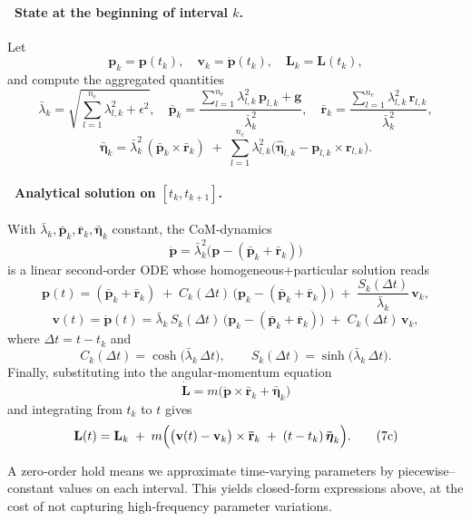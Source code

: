 \documentclass[main.tex]{subfiles}
\begin{document}
\paragraph{\ State at the beginning of interval $k$.}
Let
\[
\mathbf{p}_k = \mathbf{p}(t_k),\quad
\mathbf{v}_k = \dot{\mathbf{p}}(t_k),\quad
\mathbf{L}_k = \mathbf{L}(t_k),
\]
and compute the aggregated quantities
\[
\bar\lambda_k
=\sqrt{\sum_{l=1}^{n_e}\lambda_{l,k}^2+\epsilon^2},\quad
\mathbf{\bar{p}}_k
=\frac{\sum_{l=1}^{n_e}\lambda_{l,k}^2\,\mathbf{p}_{l,k}+\mathbf{g}}{\bar\lambda_k^2},\quad
\mathbf{\bar{r}}_k
=\frac{\sum_{l=1}^{n_e}\lambda_{l,k}^2\,\mathbf{r}_{l,k}}{\bar\lambda_k^2},
\]
\[
\mathbf{\bar{\boldsymbol{\eta}}}_k
=\bar\lambda_k^2\,(\mathbf{\bar{p}}_k\times\mathbf{\bar{r}}_k)
\;+\;\sum_{l=1}^{n_e}\lambda_{l,k}^2\bigl(\mathbf{\hat{\boldsymbol{\eta}}}_{l,k}-\mathbf{p}_{l,k}\times \mathbf{r}_{l,k}\bigr).
\]

\paragraph{\ Analytical solution on $[t_k,t_{k+1}]$.}
With $\bar\lambda_k,\mathbf{\bar{p}}_k,\mathbf{\bar{r}}_k,\mathbf{\bar{\boldsymbol{\eta}}}_k$ constant, the CoM‐dynamics 
\[
\ddot{\mathbf{p}} = \bar\lambda_k^2\bigl(\mathbf{p} -(\mathbf{\bar{p}}_k+\mathbf{\bar{r}}_k)\bigr)
\]
is a linear second‐order ODE whose homogeneous+particular solution reads
\[
\mathbf{p}(t)
= (\mathbf{\bar{p}}_k+\mathbf{\bar{r}}_k)
\;+\;C_k(\Delta t)\,\bigl(\mathbf{p}_k -(\mathbf{\bar{p}}_k+\mathbf{\bar{r}}_k)\bigr)
\;+\;\frac{S_k(\Delta t)}{\bar\lambda_k}\,\mathbf{v}_k,
\tag{7a}
\]
\[
\mathbf{v}(t)
=\dot{\mathbf{p}}(t)
=\bar\lambda_k\,S_k(\Delta t)\,\bigl(\mathbf{p}_k -(\mathbf{\bar{p}}_k+\mathbf{\bar{r}}_k)\bigr)
\;+\;C_k(\Delta t)\,\mathbf{v}_k,
\tag{7b}
\]
where $\Delta t = t - t_k$ and
\[
C_k(\Delta t) = \cosh\bigl(\bar\lambda_k\,\Delta t\bigr),\qquad
S_k(\Delta t) = \sinh\bigl(\bar\lambda_k\,\Delta t\bigr).
\]
Finally, substituting into the angular‐momentum equation
\[
\dot{\mathbf{L}} = m\bigl(\ddot{\mathbf{p}}\times \mathbf{\bar{r}}_k + \mathbf{\bar{\boldsymbol{\eta}}}_k\bigr)
\]
and integrating from $t_k$ to $t$ gives
\[
\mathbf{L}(t)
= \mathbf{L}_k
\;+\;m\Bigl(\bigl(\mathbf{v}(t)-\mathbf{v}_k\bigr)\times \mathbf{\bar{r}}_k
   \;+\;(t-t_k)\,\mathbf{\bar{\boldsymbol{\eta}}}_k\Bigr).
\tag{7c}
\]

\medskip
\begin{remark}
A zero‐order hold means we approximate time‐varying parameters by piecewise–constant values on each interval.  This yields closed‐form expressions above, at the cost of not capturing high‐frequency parameter variations.
\end{remark}
\end{document}
